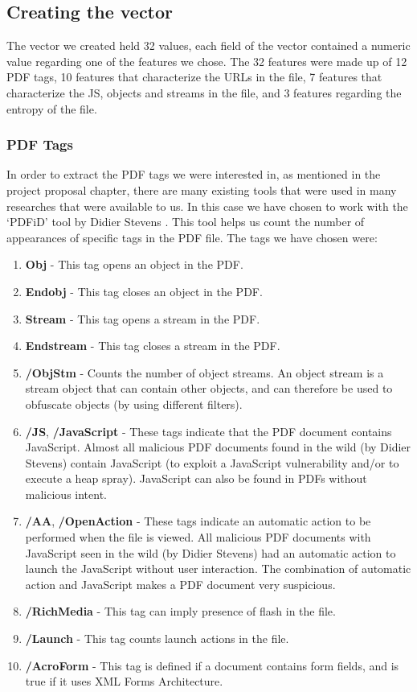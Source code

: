 \documentclass{article}
\begin{document}
\subsection{Creating the vector}
\indent	The vector we created held 32 values, each field of the vector contained a numeric value regarding one of the features we chose. The 32 features were made up of 12 PDF tags, 10 features that characterize the URLs in the file, 7 features that characterize the JS, objects and streams in the file, and 3 features regarding the entropy of the file.

\subsubsection{PDF Tags}
\indent	In order to extract the PDF tags we were interested in, as mentioned in the project proposal chapter, there are many existing tools that were used in many researches that were available to us. In this case we have chosen to work with the ‘PDFiD’ tool by Didier Stevens \cite{1}. This tool helps us count the number of appearances of specific tags in the PDF file. The tags we have chosen were:

\begin{enumerate}
	\item \textbf{Obj} - This tag opens an object in the PDF.
	\item \textbf{Endobj} - This tag closes an object in the PDF.
	\item \textbf{Stream} - This tag opens a stream in the PDF.
	\item \textbf{Endstream} - This tag closes a stream in the PDF.
	\item \textbf{/ObjStm} - Counts the number of object streams. An object stream is a stream object that can contain other objects, and can therefore be used to obfuscate objects (by using different filters).
	\item \textbf{/JS}, \textbf{/JavaScript} - These tags indicate that the PDF document contains JavaScript. Almost all malicious PDF documents found in the wild (by Didier Stevens) contain JavaScript (to exploit a JavaScript vulnerability and/or to execute a heap spray). JavaScript can also be found in PDFs without malicious intent.
	\item \textbf{/AA}, \textbf{/OpenAction} - These tags indicate an automatic action to be performed when the file is viewed. All malicious PDF documents with JavaScript seen in the wild (by Didier Stevens) had an automatic action to launch the JavaScript without user interaction. The combination of automatic action and JavaScript makes a PDF document very suspicious.
	\item \textbf{/RichMedia} - This tag can imply presence of flash in the file.
	\item \textbf{/Launch} - This tag counts launch actions in the file.
	\item \textbf{/AcroForm} - This tag is defined if a document contains form fields, and is true if it uses XML Forms Architecture.
\end{enumerate}
\end{document}

